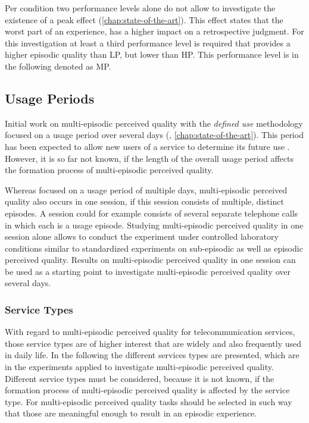Per condition two performance levels alone do not allow to investigate the existence of a peak effect (\cf \autoref{chap:state-of-the-art}).
This effect states that the worst part of an experience, has a higher impact on a retrospective judgment.
For this investigation at least a third performance level is required that provides a higher episodic quality than \ac{LP}, but lower than \ac{HP}.
This performance level is in the following denoted as \acf{MP}.

\subsection{Usage Periods}
Initial work on multi-episodic perceived quality with the \emph{defined use} methodology focused on a usage period over several days (\cf, \autoref{chap:state-of-the-art}). 
This period has been expected to allow new users of a service to determine its future use \citep[\cf,][]{moller_single-call_2011}.
However, it is so far not known, if the length of the overall usage period affects the formation process of multi-episodic perceived quality.

Whereas \citet{moller_single-call_2011} focused on a usage period of multiple days, multi-episodic perceived quality also occurs in one session, if this session consists of multiple, distinct episodes.
A session could for example consists of several separate telephone calls in which each is a usage episode.
Studying multi-episodic perceived quality in one session alone allows to conduct the experiment under controlled laboratory conditions similar to standardized experiments on sub-episodic as well as episodic perceived quality.
Results on multi-episodic perceived quality in one session can be used as a starting point to investigate multi-episodic perceived quality over several days.


\subsubsection{Service Types}
With regard to multi-episodic perceived quality for telecommunication services, those service types are of higher interest that are widely and also frequently used in daily life.
In the following the different services types are presented, which are in the experiments applied to investigate multi-episodic perceived quality.
Different service types must be considered, because it is not known, if the formation process of multi-episodic perceived quality is affected by the service type.
For multi-episodic perceived quality tasks should be selected in such way that those are meaningful enough to result in an episodic experience.

